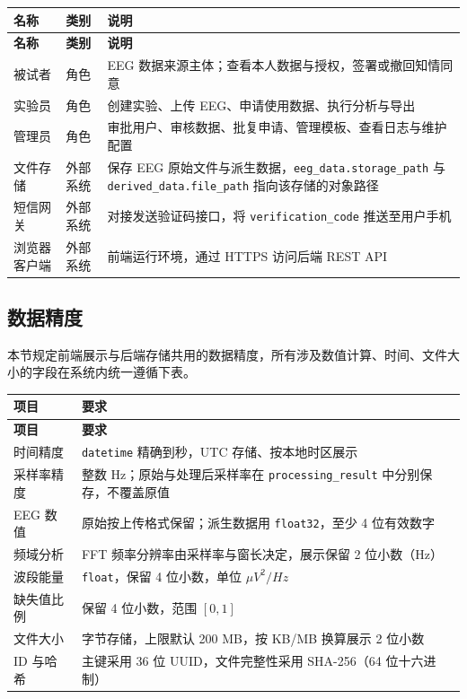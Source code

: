 {\small
\begin{longtable}{|p{28mm}|p{18mm}|p{88mm}|}
\hline
\textbf{名称} & \textbf{类别} & \textbf{说明}\\\hline
\endfirsthead
\hline
\textbf{名称} & \textbf{类别} & \textbf{说明}\\\hline
\endhead
被试者 & 角色 & EEG 数据来源主体；查看本人数据与授权，签署或撤回知情同意 \\ \hline
实验员 & 角色 & 创建实验、上传 EEG、申请使用数据、执行分析与导出 \\ \hline
管理员 & 角色 & 审批用户、审核数据、批复申请、管理模板、查看日志与维护配置 \\ \hline
文件存储 & 外部系统 & 保存 EEG 原始文件与派生数据，\texttt{eeg\_\allowbreak data.\allowbreak storage\_\allowbreak path} 与 \texttt{derived\_\allowbreak data.\allowbreak file\_\allowbreak path} 指向该存储的对象路径 \\ \hline
短信网关 & 外部系统 & 对接发送验证码接口，将 \texttt{verification\_\allowbreak code} 推送至用户手机 \\ \hline
浏览器客户端 & 外部系统 & 前端运行环境，通过 HTTPS 访问后端 REST API \\ \hline
\end{longtable}
}

\subsection{数据精度}

本节规定前端展示与后端存储共用的数据精度，所有涉及数值计算、时间、文件大小的字段在系统内统一遵循下表。

{\small
\begin{longtable}{|p{30mm}|p{104mm}|}
\hline
\textbf{项目} & \textbf{要求}\\\hline
\endfirsthead
\hline
\textbf{项目} & \textbf{要求}\\\hline
\endhead
时间精度 & \texttt{datetime} 精确到秒，UTC 存储、按本地时区展示 \\ \hline
采样率精度 & 整数 Hz；原始与处理后采样率在 \texttt{processing\_\allowbreak result} 中分别保存，不覆盖原值 \\ \hline
EEG 数值 & 原始按上传格式保留；派生数据用 \texttt{float32}，至少 4 位有效数字 \\ \hline
频域分析 & FFT 频率分辨率由采样率与窗长决定，展示保留 2 位小数（Hz）\\ \hline
波段能量 & \texttt{float}，保留 4 位小数，单位 $\mu V^2/Hz$ \\ \hline
缺失值比例 & 保留 4 位小数，范围 $[0,1]$ \\ \hline
文件大小 & 字节存储，上限默认 200 MB，按 KB/MB 换算展示 2 位小数 \\ \hline
ID 与哈希 & 主键采用 36 位 UUID，文件完整性采用 SHA-256（64 位十六进制）\\ \hline
\end{longtable}
}
